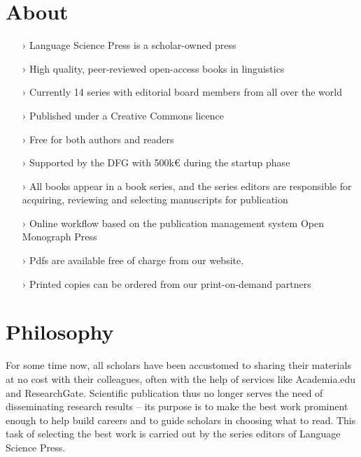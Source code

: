 \documentclass[
notumble,
nofoldmark,
]{leaflet}
\begin{document}
\section{\sffamily\Large\bfseries About}
\begin{itemize}  
\setlength{\itemsep}{-3pt} 
 \item[›] Language Science Press is a scholar-owned press
 \item[›]  High quality, peer-reviewed open-access books in linguistics
  \item[›] Currently 14 series with editorial board members from all over the world
 \item[›] Published under a Creative Commons licence
 \item[›] Free for both authors and readers
 \item[›] Supported by the DFG with 500k{\euro} during the startup phase

 \item[›] All books appear in a book series, and the series editors are responsible for acquiring, reviewing and selecting manuscripts for publication
 \item[›] Online workflow based on the publication management system Open Monograph Press
 \item[›] Pdfs are available free of charge from our website. 
 \item[›] Printed copies can be ordered from our print-on-demand partners
\end{itemize}
 
 \section{\sffamily\Large\bfseries Philosophy} 
 For some time now, all scholars have been accustomed to sharing their materials at no cost with their colleagues, often with the help of services like Academia.edu and ResearchGate. Scientific publication thus no longer serves the need of disseminating research results -- its purpose is to make the best work prominent enough to help build careers and to guide scholars in choosing what to read. This task of selecting the best work is carried out by the series editors of Language Science Press.
\end{document}
